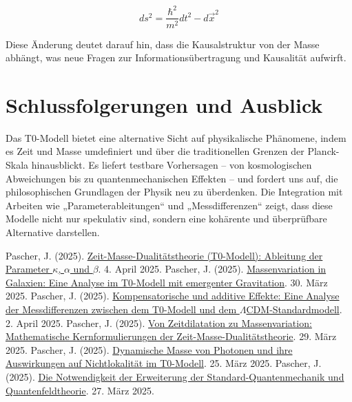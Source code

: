 \documentclass[a4paper,12pt]{article}
\begin{document}
	\begin{equation}
		ds^2 = \frac{\hbar^2}{m^2} dt^2 - d\vec{x}^2
	\end{equation}
	
	Diese Änderung deutet darauf hin, dass die Kausalstruktur von der Masse abhängt, was neue Fragen zur Informationsübertragung und Kausalität aufwirft.
	
	\section{Schlussfolgerungen und Ausblick}
	
	Das T0-Modell bietet eine alternative Sicht auf physikalische Phänomene, indem es Zeit und Masse umdefiniert und über die traditionellen Grenzen der Planck-Skala hinausblickt. Es liefert testbare Vorhersagen – von kosmologischen Abweichungen bis zu quantenmechanischen Effekten – und fordert uns auf, die philosophischen Grundlagen der Physik neu zu überdenken. Die Integration mit Arbeiten wie „Parameterableitungen“ \cite{pascher_params_2025} und „Messdifferenzen“ \cite{pascher_messdifferenzen_2025} zeigt, dass diese Modelle nicht nur spekulativ sind, sondern eine kohärente und überprüfbare Alternative darstellen.
	
	\begin{thebibliography}{99}
		 Pascher, J. (2025). \href{https://github.com/jpascher/T0-Time-Mass-Duality/tree/main/2/pdf/Deutsch/Zeit-Masse-Dualitätstheorie (T0-Modell) Herleitung der Parameter kappa, alpha und beta.pdf}{Zeit-Masse-Dualitätstheorie (T0-Modell): Ableitung der Parameter \(\kappa\), \(\alpha\) und \(\beta\)}. 4. April 2025.
		 Pascher, J. (2025). \href{https://github.com/jpascher/T0-Time-Mass-Duality/tree/main/2/pdf/Deutsch/Massenvariation in Galaxien.pdf}{Massenvariation in Galaxien: Eine Analyse im T0-Modell mit emergenter Gravitation}. 30. März 2025.
		 Pascher, J. (2025). \href{https://github.com/jpascher/T0-Time-Mass-Duality/tree/main/2/pdf/Deutsch/Analyse der Messdifferenzen zwischen dem T0-Modell und dem Standardmodell.pdf}{Kompensatorische und additive Effekte: Eine Analyse der Messdifferenzen zwischen dem T0-Modell und dem \(\Lambda\)CDM-Standardmodell}. 2. April 2025.
		 Pascher, J. (2025). \href{https://github.com/jpascher/T0-Time-Mass-Duality/tree/main/2/pdf/Deutsch/Mathematische Formulierungen der Zeit-Masse-Dualitätstheorie mit Lagrange.pdf}{Von Zeitdilatation zu Massenvariation: Mathematische Kernformulierungen der Zeit-Masse-Dualitätstheorie}. 29. März 2025.
		 Pascher, J. (2025). \href{https://github.com/jpascher/T0-Time-Mass-Duality/tree/main/2/pdf/Deutsch/Dynamische Masse von Photonen und ihre Implikationen für Nichtlokalität.tex}{Dynamische Masse von Photonen und ihre Auswirkungen auf Nichtlokalität im T0-Modell}. 25. März 2025.
		 Pascher, J. (2025). \href{https://github.com/jpascher/T0-Time-Mass-Duality/tree/main/2/pdf/Deutsch/Die Notwendigkeit einer Erweiterung der Standard-Quantenmechanik und Quantenfeldtheorie.pdf}{Die Notwendigkeit der Erweiterung der Standard-Quantenmechanik und Quantenfeldtheorie}. 27. März 2025.
	\end{thebibliography}
	
\end{document}
